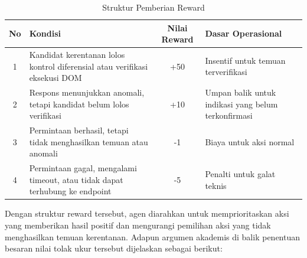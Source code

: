 \begin{table}[H]
\centering
\begin{tabular}{|c|p{7cm}|c|p{4.5cm}|}
\hline
\textbf{No} & \textbf{Kondisi} & \textbf{Nilai Reward} & \textbf{Dasar Operasional} \\ \hline

1 & Kandidat kerentanan lolos kontrol diferensial atau verifikasi eksekusi DOM & +50 & Insentif untuk temuan terverifikasi \\ \hline

2 & Respons menunjukkan anomali, tetapi kandidat belum lolos verifikasi & +10 & Umpan balik untuk indikasi yang belum terkonfirmasi \\ \hline

3 & Permintaan berhasil, tetapi tidak menghasilkan temuan atau anomali & -1 & Biaya untuk aksi normal \\ \hline

4 & Permintaan gagal, mengalami timeout, atau tidak dapat terhubung ke endpoint & -5 & Penalti untuk galat teknis \\ \hline

\end{tabular}
\caption{Struktur Pemberian Reward}
\label{tab:struktur_reward}
\end{table}

Dengan struktur reward tersebut, agen diarahkan untuk memprioritaskan aksi yang memberikan hasil positif dan mengurangi pemilihan aksi yang tidak menghasilkan temuan kerentanan. Adapun argumen akademis di balik penentuan besaran nilai tolak ukur tersebut dijelaskan sebagai berikut:

